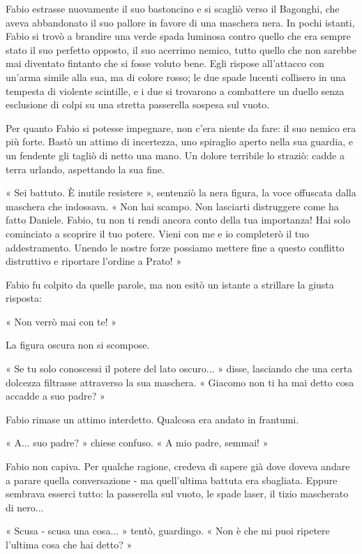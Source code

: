Fabio estrasse nuovamente il suo bastoncino e si scagliò verso il Bagonghi, che aveva abbandonato il suo pallore in favore di una  maschera nera. In pochi istanti, Fabio si trovò a brandire una verde spada luminosa contro quello che era sempre stato il suo perfetto opposto, il suo acerrimo nemico, tutto quello che non sarebbe mai diventato fintanto che si fosse voluto bene. Egli rispose all'attacco con un'arma simile alla sua, ma di colore rosso; le due spade lucenti collisero in una tempesta di violente scintille, e i due si trovarono a combattere un duello senza esclusione di colpi su una stretta passerella sospesa sul vuoto.

Per quanto Fabio si potesse impegnare, non c'era niente da fare: il suo nemico era più forte. Bastò un attimo di incertezza, uno spiraglio aperto nella sua guardia, e un fendente gli tagliò di netto una mano. Un dolore terribile lo straziò: cadde a terra urlando, aspettando la sua fine.

« Sei battuto. È inutile resistere », sentenziò la nera figura, la voce offuscata dalla maschera che indossava. « Non hai scampo. Non lasciarti distruggere come ha fatto Daniele. Fabio, tu non ti rendi ancora conto della tua importanza! Hai solo cominciato a scoprire il tuo potere. Vieni con me e io completerò il tuo addestramento. Unendo le nostre forze possiamo mettere fine a questo conflitto distruttivo e riportare l'ordine a Prato! »

Fabio fu colpito da quelle parole, ma non esitò un istante a strillare la giusta risposta:

« Non verrò mai con te! »

La figura oscura non si scompose.

« Se tu solo conoscessi il potere del lato oscuro... » disse, lasciando che una certa dolcezza filtrasse attraverso la sua  maschera. « Giacomo non ti ha mai detto cosa accadde a suo padre? »

Fabio rimase un attimo interdetto. Qualcosa era andato in frantumi.

« A... suo padre? » chiese confuso. « A mio padre, semmai! »

Fabio non capiva. Per qualche ragione, credeva di sapere già dove doveva andare a parare quella conversazione - ma quell'ultima battuta era sbagliata. Eppure sembrava esserci tutto: la passerella sul vuoto, le spade laser, il tizio mascherato di nero...

« Scusa - scusa una cosa... » tentò, guardingo. « Non è che mi puoi ripetere l'ultima cosa che hai detto? »

